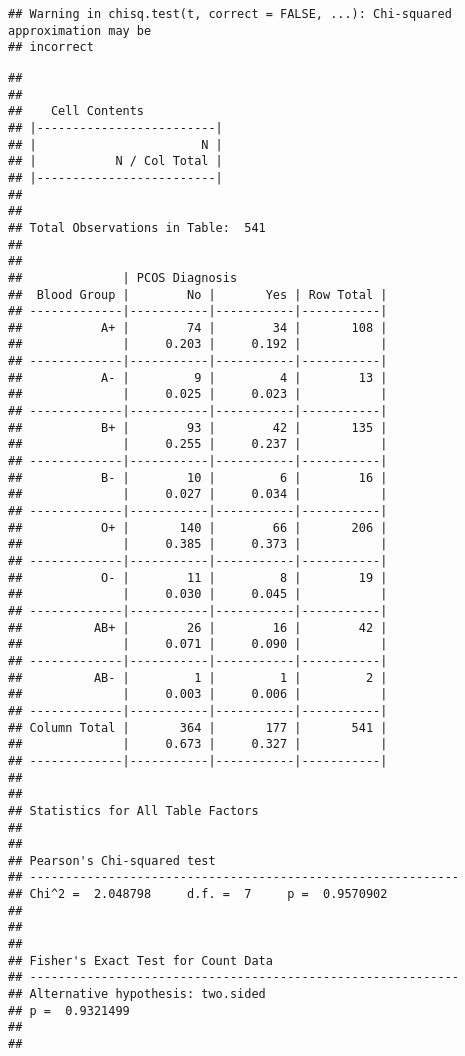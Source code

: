 \documentclass[
]{article}
\begin{document}
\begin{verbatim}
## Warning in chisq.test(t, correct = FALSE, ...): Chi-squared approximation may be
## incorrect
\end{verbatim}

\begin{verbatim}
## 
##  
##    Cell Contents
## |-------------------------|
## |                       N |
## |           N / Col Total |
## |-------------------------|
## 
##  
## Total Observations in Table:  541 
## 
##  
##              | PCOS Diagnosis 
##  Blood Group |        No |       Yes | Row Total | 
## -------------|-----------|-----------|-----------|
##           A+ |        74 |        34 |       108 | 
##              |     0.203 |     0.192 |           | 
## -------------|-----------|-----------|-----------|
##           A- |         9 |         4 |        13 | 
##              |     0.025 |     0.023 |           | 
## -------------|-----------|-----------|-----------|
##           B+ |        93 |        42 |       135 | 
##              |     0.255 |     0.237 |           | 
## -------------|-----------|-----------|-----------|
##           B- |        10 |         6 |        16 | 
##              |     0.027 |     0.034 |           | 
## -------------|-----------|-----------|-----------|
##           O+ |       140 |        66 |       206 | 
##              |     0.385 |     0.373 |           | 
## -------------|-----------|-----------|-----------|
##           O- |        11 |         8 |        19 | 
##              |     0.030 |     0.045 |           | 
## -------------|-----------|-----------|-----------|
##          AB+ |        26 |        16 |        42 | 
##              |     0.071 |     0.090 |           | 
## -------------|-----------|-----------|-----------|
##          AB- |         1 |         1 |         2 | 
##              |     0.003 |     0.006 |           | 
## -------------|-----------|-----------|-----------|
## Column Total |       364 |       177 |       541 | 
##              |     0.673 |     0.327 |           | 
## -------------|-----------|-----------|-----------|
## 
##  
## Statistics for All Table Factors
## 
## 
## Pearson's Chi-squared test 
## ------------------------------------------------------------
## Chi^2 =  2.048798     d.f. =  7     p =  0.9570902 
## 
## 
##  
## Fisher's Exact Test for Count Data
## ------------------------------------------------------------
## Alternative hypothesis: two.sided
## p =  0.9321499 
## 
## 
\end{verbatim}
\end{document}
